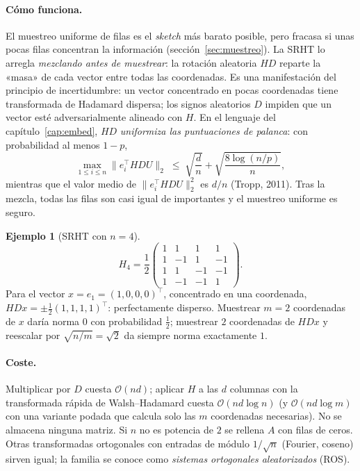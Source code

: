 \documentclass[11pt,a4paper,oneside]{book}
\theoremstyle{definition}
\newtheorem{ejemplo}[teorema]{Ejemplo}
\theoremstyle{remark}
\newcommand{\cO}{\mathcal{O}}
\newcommand{\T}{^{\top}}
\newcommand{\nrm}[1]{\lVert #1\rVert}
\begin{document}
\paragraph{Cómo funciona.} El muestreo uniforme de filas es el \emph{sketch} más barato posible, pero fracasa si
unas pocas filas concentran la información (sección~\ref{sec:muestreo}). La SRHT lo arregla
\emph{mezclando antes de muestrear}: la rotación aleatoria $HD$ reparte la «masa» de cada vector entre todas
las coordenadas. Es una manifestación del principio de incertidumbre: un vector concentrado en pocas
coordenadas tiene transformada de Hadamard dispersa; los signos aleatorios $D$ impiden que un vector esté
adversarialmente alineado con $H$. En el lenguaje del capítulo~\ref{cap:embed}, $HD$ \emph{uniformiza las
puntuaciones de palanca}: con probabilidad al menos $1-p$,
\begin{equation}\label{eq:srht-aplana}
  \max_{1\le i\le n}\nrm{e_i\T HDU}_2\;\le\;\sqrt{\frac dn}+\sqrt{\frac{8\log(n/p)}{n}} ,
\end{equation}
mientras que el valor medio de $\nrm{e_i\T HDU}_2^2$ es $d/n$ (Tropp, 2011). Tras la mezcla, todas las filas son
casi igual de importantes y el muestreo uniforme es seguro.

\begin{ejemplo}[SRHT con $n=4$]
\[ H_4=\frac12\begin{pmatrix}1&1&1&1\\1&-1&1&-1\\1&1&-1&-1\\1&-1&-1&1\end{pmatrix}. \]
Para el vector $x=e_1=(1,0,0,0)\T$, concentrado en una coordenada, $HDx=\pm\frac12(1,1,1,1)\T$: perfectamente
disperso. Muestrear $m=2$ coordenadas de $x$ daría norma $0$ con probabilidad $\tfrac12$; muestrear $2$
coordenadas de $HDx$ y reescalar por $\sqrt{n/m}=\sqrt2$ da siempre norma exactamente $1$.
\end{ejemplo}

\paragraph{Coste.} Multiplicar por $D$ cuesta $\cO(nd)$; aplicar $H$ a las $d$ columnas con la transformada
rápida de Walsh--Hadamard cuesta $\cO(nd\log n)$ (y $\cO(nd\log m)$ con una variante podada que calcula solo
las $m$ coordenadas necesarias). No se almacena ninguna matriz. Si $n$ no es potencia de $2$ se rellena $A$
con filas de ceros. Otras transformadas ortogonales con entradas de módulo $1/\sqrt n$ (Fourier, coseno)
sirven igual; la familia se conoce como \emph{sistemas ortogonales aleatorizados} (ROS).
\end{document}
